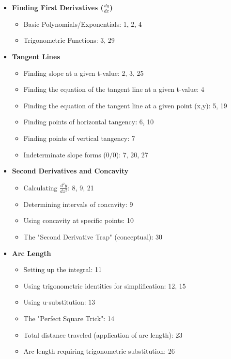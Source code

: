 \documentclass{article}
\begin{document}
\begin{itemize}
    \item \textbf{Finding First Derivatives ($\frac{dy}{dx}$)}
    \begin{itemize}
        \item Basic Polynomials/Exponentials: 1, 2, 4
        \item Trigonometric Functions: 3, 29
    \end{itemize}

    \item \textbf{Tangent Lines}
    \begin{itemize}
        \item Finding slope at a given t-value: 2, 3, 25
        \item Finding the equation of the tangent line at a given t-value: 4
        \item Finding the equation of the tangent line at a given point (x,y): 5, 19
        \item Finding points of horizontal tangency: 6, 10
        \item Finding points of vertical tangency: 7
        \item Indeterminate slope forms (0/0): 7, 20, 27
    \end{itemize}

    \item \textbf{Second Derivatives and Concavity}
    \begin{itemize}
        \item Calculating $\frac{d^2y}{dx^2}$: 8, 9, 21
        \item Determining intervals of concavity: 9
        \item Using concavity at specific points: 10
        \item The "Second Derivative Trap" (conceptual): 30
    \end{itemize}

    \item \textbf{Arc Length}
    \begin{itemize}
        \item Setting up the integral: 11
        \item Using trigonometric identities for simplification: 12, 15
        \item Using u-substitution: 13
        \item The "Perfect Square Trick": 14
        \item Total distance traveled (application of arc length): 23
        \item Arc length requiring trigonometric substitution: 26
    \end{itemize}


\end{itemize}
\end{document}
